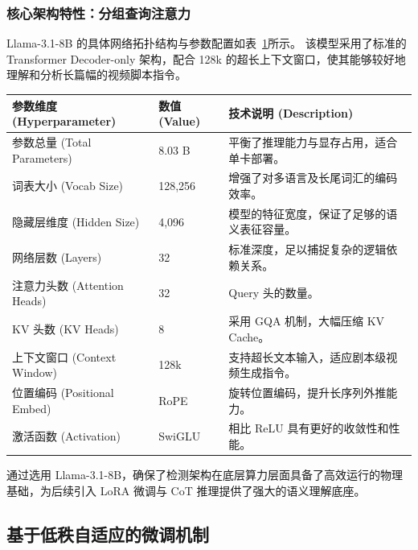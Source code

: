 \subsubsection{核心架构特性：分组查询注意力}
Llama-3.1-8B 的具体网络拓扑结构与参数配置如表~\ref{tab:model_hyperparameters}所示。
该模型采用了标准的 Transformer Decoder-only 架构，配合 128k 的超长上下文窗口，使其能够较好地理解和分析长篇幅的视频脚本指令。
\begin{table}[!t]
    \centering
    \label{tab:model_hyperparameters}
    \setlength{\tabcolsep}{8pt} %
    \renewcommand{\arraystretch}{1.2} %
    \begin{tabularx}{\textwidth}{l l X}
        \toprule
        \textbf{参数维度 (Hyperparameter)} & \textbf{数值 (Value)} & \textbf{技术说明 (Description)} \\
        \midrule
        参数总量 (Total Parameters) & 8.03 B & 平衡了推理能力与显存占用，适合单卡部署。 \\
        词表大小 (Vocab Size) & 128,256 & 增强了对多语言及长尾词汇的编码效率。 \\
        隐藏层维度 (Hidden Size) & 4,096 & 模型的特征宽度，保证了足够的语义表征容量。 \\
        网络层数 (Layers) & 32 & 标准深度，足以捕捉复杂的逻辑依赖关系。 \\
        注意力头数 (Attention Heads) & 32 & Query 头的数量。 \\
        KV 头数 (KV Heads) & 8 & 采用 GQA 机制，大幅压缩 KV Cache。 \\
        上下文窗口 (Context Window) & 128k & 支持超长文本输入，适应剧本级视频生成指令。 \\
        位置编码 (Positional Embed) & RoPE & 旋转位置编码，提升长序列外推能力。 \\
        激活函数 (Activation) & SwiGLU & 相比 ReLU 具有更好的收敛性和性能。 \\
        \bottomrule
    \end{tabularx}
\end{table}

通过选用 Llama-3.1-8B，确保了检测架构在底层算力层面具备了高效运行的物理基础，为后续引入 LoRA 微调与 CoT 推理提供了强大的语义理解底座。

\subsection{基于低秩自适应的微调机制}

